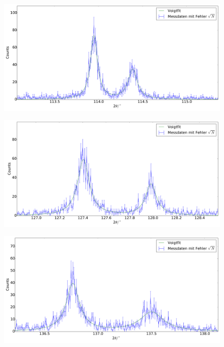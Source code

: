 \begin{figure}[H]
\begin{minipage}{.52\textwidth}
  \centering
  \includegraphics[scale=0.18]{messung_pulver_9}
  \label{fig:pul_mess_9}
\end{minipage}
\hspace{0.2cm}
\begin{minipage}{.52\textwidth}
  \centering
  \includegraphics[scale=0.18]{messung_pulver_10}
  \label{fig:pul_mess_10}
\end{minipage}
\end{figure}
\begin{figure}[H]
\begin{minipage}{.52\textwidth}
  \centering
  \includegraphics[scale=0.18]{messung_pulver_11}
  \label{fig:pul_mess_11}
\end{minipage}
\end{figure}
